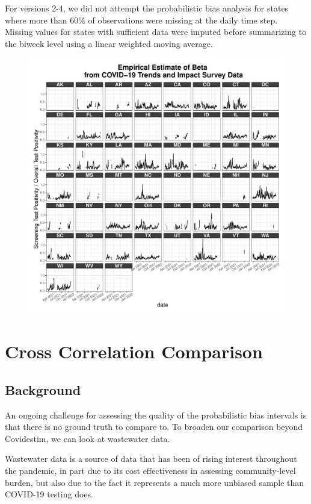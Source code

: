 \documentclass[12pt,twoside]{smiththesis}
\begin{document}
For versions 2-4, we did not attempt the probabilistic bias analysis for states where more than 60\% of observations were missing at the daily time step. Missing values for states with sufficient data were imputed before summarizing to the biweek level using a linear weighted moving average.
\begin{figure}
\includegraphics[width=1\linewidth]{figure/ctis_beta_states} \caption{\label{fig:statectis}}\label{fig:unnamed-chunk-5}
\end{figure}
\hypertarget{cross-correlation-comparison}{%
\section{Cross Correlation Comparison}\label{cross-correlation-comparison}}

\hypertarget{background-1}{%
\subsection{Background}\label{background-1}}

An ongoing challenge for assessing the quality of the probabilistic bias intervals is that there is no ground truth to compare to. To broaden our comparison beyond Covidestim, we can look at wastewater data.

Wastewater data is a source of data that has been of rising interest throughout the pandemic, in part due to its cost effectiveness in assessing community-level burden, but also due to the fact it represents a much more unbiased sample than COVID-19 testing does.
\end{document}
